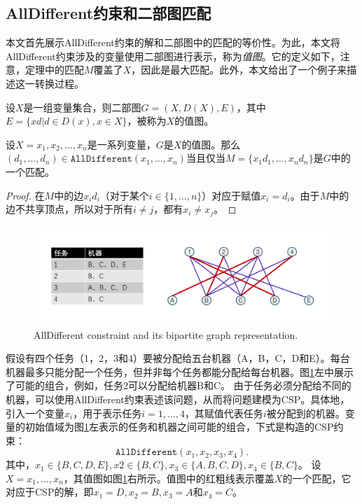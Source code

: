 \subsection{AllDifferent约束和二部图匹配}

本文首先展示AllDifferent约束的解和二部图中的匹配的等价性。为此，本文将AllDifferent约束涉及的变量使用二部图进行表示，称为\textit{值图}。它的定义如下，注意，定理中的匹配$M$覆盖了$X$，因此是最大匹配。此外，本文给出了一个例子来描述这一转换过程。
\begin{definition}[\textbf{值图}]
设$X$是一组变量集合，则二部图$G = (X, D(X), E)$，其中$E = \{xd | d \in D(x), x \in X\}$，被称为$X$的值图。
\end{definition}

\begin{theorem}
设$X = x_1, x_2, \dots, x_n$是一系列变量，$G$是$X$的值图。那么$(d_1, \dots, d_n) \in \texttt {AllDifferent}(x_1, \dots, x_n)$当且仅当$M = \{x_1d_1, \dots, x_nd_n\}$是$G$中的一个匹配。
\end{theorem}

\begin{proof}
在$M$中的边$x_id_i$（对于某个$i \in \{1, . . . , n\}$）对应于赋值$x_i = d_i$。由于$M$中的边不共享顶点，所以对于所有$i \neq j$，都有$x_i \neq x_j$。
\end{proof}

\begin{figure}[t]
    \centering
    \includegraphics[width=\columnwidth]{Img/A&G.pdf}
     {AllDifferent constraint and its bipartite graph representation.}
    \label{fig:AandG}
\end{figure}

\begin{example}
    假设有四个任务（1，2，3和4）要被分配给五台机器（A，B，C，D和E）。每台机器最多只能分配一个任务，但并非每个任务都能分配给每台机器。图\ref{fig:AandG}左中展示了可能的组合，例如，任务2可以分配给机器B和C。
    由于任务必须分配给不同的机器，可以使用AllDifferent约束表述该问题，从而将问题建模为CSP。具体地，引入一个变量$x_i$，用于表示任务$i = 1, \dots, 4$，其赋值代表任务$i$被分配到的机器。变量的初始值域为图\ref{fig:AandG}左表示的任务和机器之间可能的组合，下式是构造的CSP约束：
    \begin{equation*}
        \texttt {AllDifferent}(x_1, x_2, x_3, x_4).
    \end{equation*}
    其中，$x_1 \in \{B, C, D, E\}, x2 \in \{B, C\}, x_3 \in \{A, B, C, D\}, x_4 \in \{B, C\}$。
    设$X = x_1, \dots, x_n$，其值图如图\ref{fig:AandG}右所示。值图中的红粗线表示覆盖$X$的一个匹配，它对应于CSP的解，即$x_1 = D, x_2 = B, x_3 = A$和$x_4 = C$。
\end{example}

